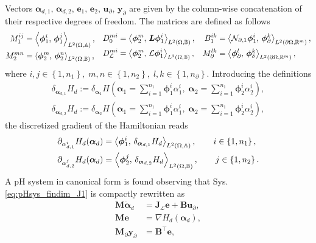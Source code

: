 Vectors $\bm{\alpha}_{d, 1},\, \bm{\alpha}_{d, 2}, \, \mathbf{e}_{1}, \, \mathbf{e}_{2}, \, \mathbf{u}_\partial, \, \mathbf{y}_\partial$ are given by the column-wise concatenation of their respective degrees of freedom. The matrices are defined as follows 
\begin{equation}
\begin{aligned}
M_1^{ij} &= \inner[L^2(\Omega, \mathbb{A})]{\bm\phi_1^i}{\bm\phi_1^j}, \\
M_2^{mn} &= \inner[L^2(\Omega, \mathbb{B})]{\bm\phi_2^m}{\bm\phi_2^n}, \\
\end{aligned}\quad
\begin{aligned}
{D}_{0}^{mi} &= \inner[L^2(\Omega, \mathbb{B})]{\bm\phi_2^m}{\bm{L}\bm\phi_1^i}, \\
{D}_{\mathcal{L}}^{mi} &= \inner[L^2(\Omega, \mathbb{B})]{\bm\phi_2^m}{\mathcal{L}\bm\phi_1^i}, 
\end{aligned}\quad  
\begin{aligned}
{B}_{1}^{ik} &= \inner[L^2(\partial \Omega, \mathbb{R}^m)]{\mathcal{N}_{\partial, 1}\bm\phi_1^i}{\bm\phi_\partial^k}, \\
M_\partial^{lk} &= \inner[L^2(\partial \Omega, \mathbb{R}^m)]{\bm\phi_\partial^l}{\bm\phi_\delta^k},
\end{aligned}
\end{equation}
where $i, j \in \left\{1, n_1\right\}, \; m,n \in \left\{1, n_2\right\}, \; l, k \in \left\{1, n_\partial \right\}$. Introducing the definitions
\begin{align*}
	\delta_{\bm{\alpha}_{d, 1}} H_d := \delta_{\bm{\alpha}_{1}} H\left(\bm{\alpha}_1 = \sum_{i=1}^{n_1} \bm{\phi}_1^i \alpha_1^i, \;  \bm{\alpha}_2 = \sum_{i=1}^{n_1} \bm{\phi}_2^i \alpha_2^i\right), \\
	\delta_{\bm{\alpha}_{d, 2}} H_d := \delta_{\bm{\alpha}_{2}} H\left(\bm{\alpha}_1 = \sum_{i=1}^{n_1} \bm{\phi}_1^i \alpha_1^i, \;  \bm{\alpha}_2 = \sum_{i=1}^{n_1} \bm{\phi}_2^i \alpha_2^i\right),
\end{align*}
the discretized gradient of the Hamiltonian reads
\begin{equation}
\begin{aligned}
\partial_{{\alpha}_{d, 1}^i} H_d(\bm{\alpha}_d) &= \inner[L^2(\Omega, \mathbb{A})]{\bm\phi_1^i}{\delta_{\bm{\alpha}_{d, 1}} H_d}, \qquad i \in \left\{1, n_1\right\}, \\
\partial_{{\alpha}_{d, 2}^j} H_d(\bm{\alpha}_d) &= \inner[L^2(\Omega, \mathbb{B})]{\bm\phi_2^j}{\delta_{\bm{\alpha}_{d, 2}} H_d}, \qquad j \in \left\{1, n_2\right\}.
\end{aligned}
\end{equation}
A pH system in canonical form is found observing that Sys. \eqref{eq:pHsys_findim_J1} is compactly rewritten as 
\begin{align}
\mathbf{M} \dot{\bm{\alpha}}_{d} &= \mathbf{J}_{\mathcal{L}} \mathbf{e} + \mathbf{B}\mathbf{u}_\partial, \label{eq:pH_findim_dyn1} \\
\mathbf{M} \mathbf{e} &= \nabla H_d(\bm{\alpha}_d), \label{eq:pH_findin_e}\\
\mathbf{M}_\partial {\mathbf{y}_\partial} &= \mathbf{B}^\top \mathbf{e},
\end{align}

